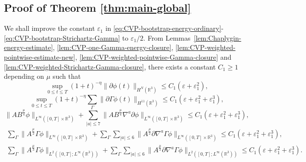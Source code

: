 \documentclass[11pt,twoside]{article}
\theoremstyle{plain}
\theoremstyle{definition}
\theoremstyle{assumption}
\numberwithin{equation}{section}
\begin{document}
	\subsection{Proof of Theorem \ref{thm:main-global}}\label{YHC-31}
	
	
	We shall improve the constant \(\varepsilon_1\) in
	\eqref{eq:CVP-bootstrap-energy-ordinary}-\eqref{eq:CVP-bootstrap-Strichartz-Gamma}
	to \(\varepsilon_1/2\).
	From Lemmas~\ref{lem:Chaplygin-energy-estimate}, \ref{lem:CVP-one-Gamma-energy-closure}, \ref{lem:CVP-weighted-pointwise-estimate-new}, \ref{lem:CVP-weighted-pointwise-Gamma-closure} and \ref{lem:CVP-weighted-Strichartz-Gamma-closure}, there exists a constant \(C_1\ge 1\) depending on $\mu$ such that
	\begin{equation}
		\label{eq:improve-energy-ordinary}
		\sup_{0\le t\le T}(1+t)^{-\eta}\|\partial\phi(t)\|_{H^N(\mathbb R^3)}
		\le C_1(\varepsilon+\varepsilon_1^2),
	\end{equation}
	\begin{equation}
		\label{eq:improve-energy-Gamma}
		\sup_{0\le t\le T}(1+t)^{-\eta}\sum_{\Gamma}\|\partial\Gamma\phi(t)\|_{H^{11}(\mathbb R^3)}
		\le C_1(\varepsilon+\varepsilon_1^2+\varepsilon_1^3),
	\end{equation}
	\begin{equation}
		\label{eq:improve-pointwise-phi}
		\bigl\|AB^{\frac{\mu}{4}}\phi\bigr\|_{L^\infty([0,T]\times\mathbb R^3)}
		+\sum_{|a|\le 7}\bigl\|AB^{\frac{\mu}{4}}\nabla^a\partial\phi\bigr\|_{L^\infty([0,T]\times\mathbb R^3)}
		\le C_1(\varepsilon+\varepsilon_1^2+\varepsilon_1^3),
	\end{equation}
	\begin{equation}
		\label{eq:improve-pointwise-Gamma}
		\begin{aligned}
			\sum_{\Gamma}\bigl\|A^{\frac{\mu}{2}}\Gamma\phi\bigr\|_{L^\infty([0,T]\times\mathbb R^3)}
			+\sum_{\Gamma}\sum_{|a|\le 6}\bigl\|A^{\frac{\mu}{2}}\partial\nabla^a\Gamma\phi\bigr\|_{L^\infty([0,T]\times\mathbb R^3)}
			\le C_1(\varepsilon+\varepsilon_1^2+\varepsilon_1^3),
		\end{aligned}
	\end{equation}
	\begin{equation}
		\label{eq:improve-Strichartz-Gamma}
		\begin{aligned}
			\sum_{\Gamma}\bigl\|A^{\frac{\mu}{3}}\Gamma\phi\bigr\|_{L^2([0,T];L^\infty(\mathbb R^3))}
			+\sum_{\Gamma}\sum_{|a|\le 6}\bigl\|A^{\frac{\mu}{3}}\partial\nabla^a\Gamma\phi\bigr\|_{L^2([0,T];L^\infty(\mathbb R^3))}
			\le C_1(\varepsilon+\varepsilon_1^2+\varepsilon_1^3).
		\end{aligned}
	\end{equation}
\end{document}
